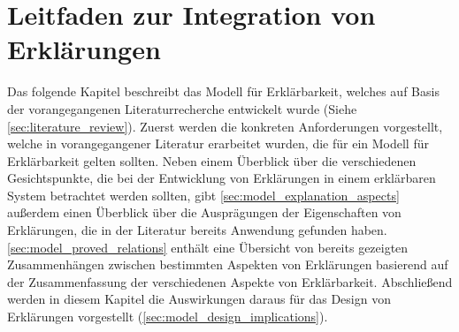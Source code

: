 \chapter{Leitfaden zur Integration von Erklärungen}

Das folgende Kapitel beschreibt das Modell für Erklärbarkeit, welches auf Basis der vorangegangenen Literaturrecherche entwickelt wurde (Siehe \autoref{sec:literature_review}). Zuerst werden die konkreten Anforderungen vorgestellt, welche in vorangegangener Literatur erarbeitet wurden, die für ein Modell für Erklärbarkeit gelten sollten. Neben einem Überblick über die verschiedenen Gesichtspunkte, die bei der Entwicklung von Erklärungen in einem erklärbaren System betrachtet werden sollten, gibt \autoref{sec:model_explanation_aspects} außerdem einen Überblick über die Ausprägungen der Eigenschaften von Erklärungen, die in der Literatur bereits Anwendung gefunden haben. \autoref{sec:model_proved_relations} enthält eine Übersicht von bereits gezeigten Zusammenhängen zwischen bestimmten Aspekten von Erklärungen basierend auf der Zusammenfassung der verschiedenen Aspekte von Erklärbarkeit. Abschließend werden in diesem Kapitel die Auswirkungen daraus für das Design von Erklärungen vorgestellt (\autoref{sec:model_design_implications}).






